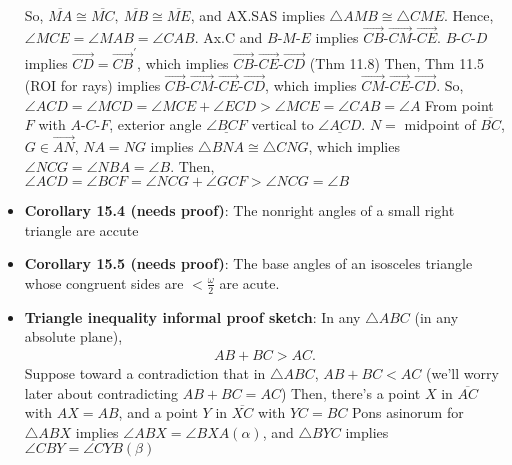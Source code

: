 \documentclass{report}
\begin{document}
\begin{itemize}
            \bigbreak \noindent 
            So, $\overline{MA} \cong \overline{MC}, \ \overline{MB} \cong \overline{ME}$, and AX.SAS implies $ \triangle AMB  \cong \triangle CME$.
            \bigbreak \noindent 
            Hence, $\angle MCE  = \angle MAB = \angle CAB$. Ax.C and $ B\text{-}M\text{-}E$ implies $ \overrightarrow{CB}\text{-}\overrightarrow{CM}\text{-}\overrightarrow{CE} $. $ B\text{-}C\text{-}D $ implies $ \overrightarrow{CD} = \overrightarrow{CB}^{\prime} $, which implies $ \overrightarrow{CB}\text{-}\overrightarrow{CE}\text{-}\overrightarrow{CD} $ (Thm 11.8)
            \bigbreak \noindent 
            Then, Thm 11.5 (ROI for rays) implies $ \overrightarrow{CB}\text{-}\overrightarrow{CM}\text{-}\overrightarrow{CE}\text{-}\overrightarrow{CD}$, which implies $ \overrightarrow{CM}\text{-}\overrightarrow{CE}\text{-} \overrightarrow{CD}$. So, $ \angle ACD = \angle MCD = \angle MCE + \angle ECD > \angle MCE = \angle CAB = \angle A$
            \bigbreak \noindent 
            From point $F$ with $ A\text{-}C\text{-}F$, exterior angle $ \underline{\angle BCF}$ vertical to $ \underline{\angle ACD} $. $N = $ midpoint of $\overline{BC}$, $G \in \overrightarrow{AN}$, $NA = NG $ implies $ \triangle BNA \cong\triangle CNG$, which implies $\angle NCG = \angle NBA = \angle B$. Then, $\angle ACD = \angle BCF = \angle NCG + \angle GCF > \angle NCG = \angle B $
            \bigbreak \noindent 
        \item \textbf{Corollary 15.4 (needs proof)}: The nonright angles of a small right triangle are accute
        \item \textbf{Corollary 15.5 (needs proof)}: The base angles of an isosceles triangle whose congruent sides are $< \frac{\omega}{2}$ are acute.
        \item \textbf{Triangle inequality informal proof sketch}: In any $ \triangle ABC$ (in any absolute plane),
            \begin{align*}
                AB + BC > AC
            .\end{align*}
            Suppose toward a contradiction that in $ \triangle ABC $, $ AB + BC < AC$ (we'll worry later about contradicting $ AB + BC = AC $)
            \bigbreak \noindent 
            Then, there's a point $X$ in $ \overline{AC}$ with $AX = AB$, and a point $ Y$ in $ \overline{XC}$ with $YC = BC$
            \bigbreak \noindent 
            \bigbreak \noindent 
            Pons asinorum for $ \triangle ABX$ implies $ \angle ABX = \angle BXA (\alpha)$, and $ \triangle BYC$ implies $ \angle CBY = \angle CYB (\beta) $

\end{itemize}
\end{document}
